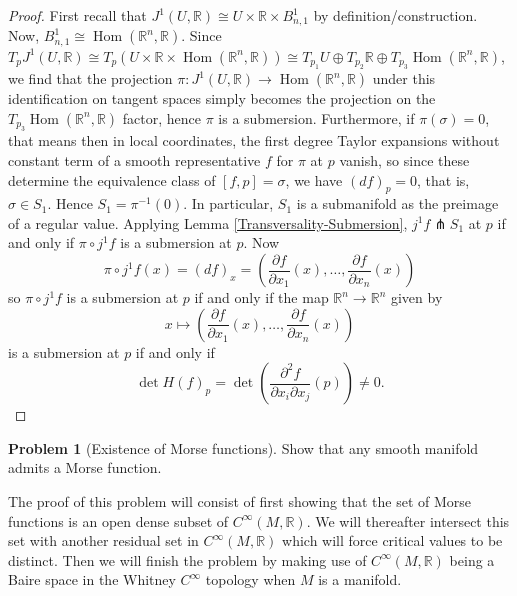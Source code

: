 \documentclass[reqno]{amsart}
\theoremstyle{definition}
\newtheorem{problem}[theorem]{Problem}
\theoremstyle{remark}
\DeclareMathOperator{\Hom}{Hom}
\begin{document}
 \begin{proof}
     First recall that
     $J^{1}(U,\mathbb{R}) \cong
     U \times \mathbb{R} \times B_{n,1}^{1}$ by
     definition/construction. Now,
     $B_{n,1}^{1} \cong
     \Hom \left( \mathbb{R}^{n},\mathbb{R} \right) $.
     Since
     $T_p J^{1}(U,\mathbb{R}) \cong
     T_{p} \left( U \times \mathbb{R} \times 
     \Hom \left( \mathbb{R}^{n},\mathbb{R} \right) \right) 
     \cong T_{p_1}U \oplus
     T_{p_2} \mathbb{R} \oplus
     T_{p_3} \Hom\left( \mathbb{R}^{n},\mathbb{R} \right) $,
     we find that the projection
     $\pi \colon J^{1}\left( U,\mathbb{R} \right) 
     \to \Hom \left( \mathbb{R}^{n},\mathbb{R} \right) $ 
     under this identification on tangent spaces
     simply becomes the projection on the
     $T_{p_3}\Hom \left( \mathbb{R}^{n},\mathbb{R} \right) $ 
     factor, hence $\pi$ is a submersion.
     Furthermore,
     if $\pi (\sigma) = 0$, that means then
     in local coordinates, the first degree
     Taylor expansions without constant term
     of a smooth representative  $f$ for $\pi$ at
     $p$ vanish, so since these determine
     the equivalence class of $\left[ f,p \right] = 
     \sigma$, we
     have  $(df)_p = 0$, that is, $\sigma
     \in S_1$.
     Hence $S_1 = \pi^{-1}(0)$. In particular,
     $S_1$ is a submanifold as the preimage of a
     regular value.
     Applying Lemma \ref{Transversality-Submersion},
     $j^{1}f \pitchfork S_1$ at $p$ if and only if
     $\pi \circ j^{1} f$ is a submersion at $p$.
     Now \[
     \pi \circ j^{1} f(x) = 
     \left( df \right)_x 
     =
     \left( \frac{\partial f}{\partial x_1}(x),
     \ldots, \frac{\partial f}{\partial x_n}(x)\right)
     \] 
     so $\pi \circ j^{1}f$ is a submersion at $p$ if
     and only if
     the map
     $\mathbb{R}^{n} \to \mathbb{R}^{n}$ 
     given by
     \[
     x\mapsto \left( \frac{\partial f}{\partial x_1}(x),
     \ldots, \frac{\partial f}{\partial x_n}(x)\right) 
     \] is a submersion at $p$ if and only if
     \[
     \det H (f)_p = \det \left( \frac{\partial^2 f}{
     \partial x_i \partial x_j} (p) \right) \neq 0.
     \] 
 \end{proof}


 \begin{problem}[Existence of Morse functions]
     Show that any smooth manifold admits a Morse function.
 \end{problem}

 The proof of this problem will
 consist of first showing that
 the set of Morse functions is an open dense
 subset of $C^{\infty}(M,\mathbb{R})$. We will
 thereafter intersect this set with another residual
 set in $C^{\infty}(M,\mathbb{R})$ which will force
 critical values to be distinct. Then
 we will finish the problem by making use of
 $C^{\infty}(M,\mathbb{R})$ being a Baire space in
 the Whitney $C^{\infty}$ topology when
 $M$ is a manifold.
\end{document}

